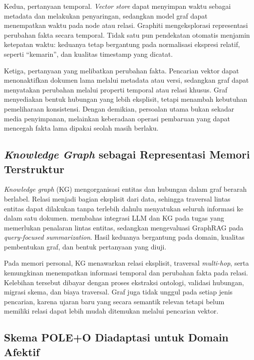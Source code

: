 Kedua, pertanyaan temporal. \textit{Vector store} dapat menyimpan waktu sebagai metadata dan melakukan penyaringan, sedangkan model graf dapat menempatkan waktu pada node atau relasi. Graphiti \parencite{rasmussen2025zep} mengeksplorasi representasi perubahan fakta secara temporal. Tidak satu pun pendekatan otomatis menjamin ketepatan waktu: keduanya tetap bergantung pada normalisasi ekspresi relatif, seperti ``kemarin'', dan kualitas timestamp yang dicatat.

Ketiga, pertanyaan yang melibatkan perubahan fakta. Pencarian vektor dapat menonaktifkan dokumen lama melalui metadata atau versi, sedangkan graf dapat menyatakan perubahan melalui properti temporal atau relasi khusus. Graf menyediakan bentuk hubungan yang lebih eksplisit, tetapi menambah kebutuhan pemeliharaan konsistensi. Dengan demikian, persoalan utama bukan sekadar media penyimpanan, melainkan keberadaan operasi pembaruan yang dapat mencegah fakta lama dipakai seolah masih berlaku.

\subsection{\textit{Knowledge Graph} sebagai Representasi Memori Terstruktur}
\label{subsec:kg-struktur}

\textit{Knowledge graph} (KG) mengorganisasi entitas dan hubungan dalam graf berarah berlabel. Relasi menjadi bagian eksplisit dari data, sehingga traversal lintas entitas dapat dilakukan tanpa terlebih dahulu menyatukan seluruh informasi ke dalam satu dokumen. \textcite{pan2024} membahas integrasi LLM dan KG pada tugas yang memerlukan penalaran lintas entitas, sedangkan \textcite{edge2024graphrag} mengevaluasi GraphRAG pada \textit{query-focused summarization}. Hasil keduanya bergantung pada domain, kualitas pembentukan graf, dan bentuk pertanyaan yang diuji.

Pada memori personal, KG menawarkan relasi eksplisit, traversal \textit{multi-hop}, serta kemungkinan menempatkan informasi temporal dan perubahan fakta pada relasi. Kelebihan tersebut dibayar dengan proses ekstraksi ontologi, validasi hubungan, migrasi skema, dan biaya traversal. Graf juga tidak unggul pada setiap jenis pencarian, karena ujaran baru yang secara semantik relevan tetapi belum memiliki relasi dapat lebih mudah ditemukan melalui pencarian vektor.

\subsection{Skema POLE+O Diadaptasi untuk Domain Afektif}
\label{subsec:pole-o}

